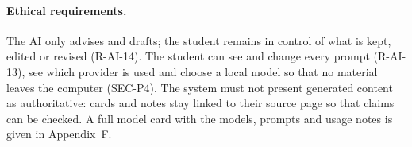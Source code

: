 \paragraph{Ethical requirements.} The AI only advises and drafts; the student remains in control
of what is kept, edited or revised (R-AI-14). The student can see and change every prompt
(R-AI-13), see which provider is used and choose a local model so that no material leaves the
computer (SEC-P4). The system must not present generated content as authoritative: cards and
notes stay linked to their source page so that claims can be checked. A full model card with the
models, prompts and usage notes is given in Appendix~F.
